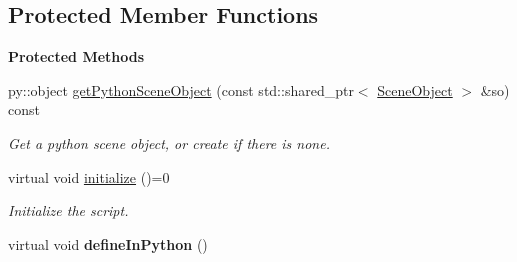 \subsection*{Protected Member Functions}
\begin{Indent}\textbf{ Protected Methods}\par
\begin{DoxyCompactItemize}
\item 
\mbox{\label{classrev_1_1_python_script_ae6aee36da7a012feb44d8c2ef795d96c}} 
py\+::object \mbox{\hyperlink{classrev_1_1_python_script_ae6aee36da7a012feb44d8c2ef795d96c}{get\+Python\+Scene\+Object}} (const std\+::shared\+\_\+ptr$<$ \mbox{\hyperlink{classrev_1_1_scene_object}{Scene\+Object}} $>$ \&so) const
\begin{DoxyCompactList}\small\item\em Get a python scene object, or create if there is none. \end{DoxyCompactList}\item 
\mbox{\label{classrev_1_1_python_script_a1aaf7198b1244df271ed91b01e226254}} 
virtual void \mbox{\hyperlink{classrev_1_1_python_script_a1aaf7198b1244df271ed91b01e226254}{initialize}} ()=0
\begin{DoxyCompactList}\small\item\em Initialize the script. \end{DoxyCompactList}\item 
\mbox{\label{classrev_1_1_python_script_acb1864c1f92b7c724b7e9b3b046c143e}} 
virtual void {\bfseries define\+In\+Python} ()
\end{DoxyCompactItemize}
\end{Indent}
